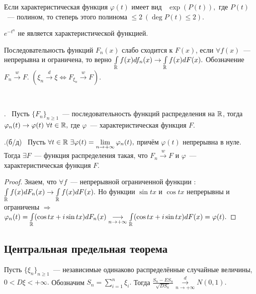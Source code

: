 	\begin{theorem}[Марцинкевича(б/д)]
		Если характеристическая функция \(\varphi(t)\) имеет вид ~\(\exp(P(t)),\) где \(P(t)\)~--- полином, то степерь этого полинома \(\leqslant 2 ~(\deg P(t) \leqslant 2).\)
	\end{theorem}
	\begin{example}
		\(e^{-t^n}\) не является характеристической функцией.
	\end{example}

	\begin{definition}
		Последовательность функций \(F_n(x)\) слабо сходится к \(F(x)\), если \(\forall f(x)\)~---  непрерывна и ограничена, то верно \(\int\limits_{\mathbb{R}} f(x) df_n(x) \to \int\limits_{\mathbb{R}} f(x)dF(x).\) Обозначение \(F_n \overset{w}{\longrightarrow}F.\)
		\((\xi_n \overset{d}{\longrightarrow}\xi \Leftrightarrow F_{\xi_n} \overset{w}{\longrightarrow}F).\)
	\end{definition}
	\begin{theorem}~~~~~~~~~~~~~~~~~~~~~~~~~~~~~~~~~~~~~~~~~

		. ~Пусть \(\{F_n\}_{n \geqslant 1}\)~--- последовательность функций распределения на \(\mathbb{R}\), тогда \(\varphi_n(t) \to \varphi(t) ~ \forall t \in \mathbb{R}, \) где \(\varphi\)~--- характеристическая функция \(F\).
		
		.(б/д)~ Пусть \(\forall t \in \mathbb{R} ~ \exists \varphi(t) = \lim\limits_{n \to +\infty} \varphi_n(t), \) причём \(\varphi(t)\) непрерывна в нуле. Тогда \(\exists F\)~--- функция распределения такая, что \(F_n \overset{w}{\longrightarrow}F\) и \(\varphi\)~---характеристическая функция \(F\).
	\end{theorem}

	\begin{proof}
		Знаем, что  \(\forall f\)~--- непрерывной ограниченной функции : \(\int\limits_{\mathbb{R}} f(x)dF_n(x) \to \int\limits_{\mathbb{R}} f(x)dF(x).\) Но функции \(\sin tx \) и \(\cos tx\) непрерывны и ограничены \(\Rightarrow\) \(\varphi_n(t) = \int\limits_{\mathbb{R}} (\cos tx + i\sin tx)dF_n(x) \underset{n \to +\infty}{\longrightarrow} \int\limits_{\mathbb{R}} (\cos tx + i\sin tx)dF(x) = \varphi(t).\)
	\end{proof}

	\subsection{Центральная предельная теорема}
	\begin{theorem}
		Пусть \(\{\xi_n\}_{n\geqslant 1}\)~--- независимые одинаково распределённые случайные величины, \(0 < D\xi < +\infty.\)
		Обозначим \(S_n = \sum\limits_{i = 1}^{n}\xi_i.\) Тогда 
		\(\frac{S_n - ES_n}{\sqrt{DS_n}} \overset{d}{\underset{n \to +\infty}{\longrightarrow}}N(0, 1).\)
	\end{theorem}

